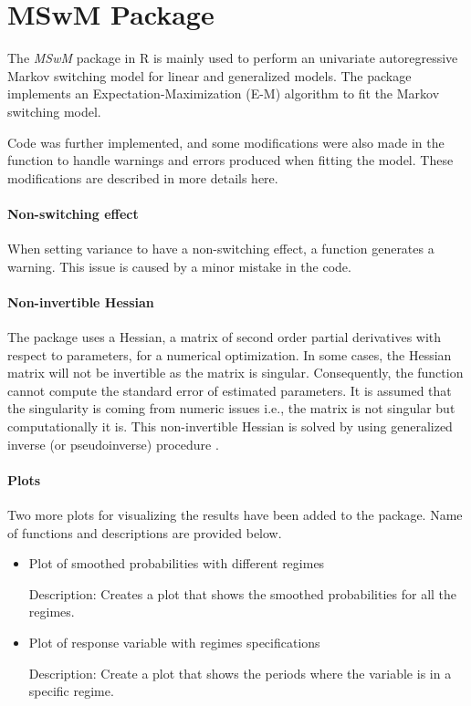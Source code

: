 \section{MSwM Package\label{sec:MSwM-Package}}

The \emph{MSwM} package in R \citep{mswm} is mainly used to perform
an univariate autoregressive Markov switching model for linear and
generalized models. The package implements an Expectation-Maximization
(E-M) algorithm to fit the Markov switching model. 

Code was further implemented, and some modifications were also made
in the function to handle warnings and errors produced when fitting
the model. These modifications are described in more details here.

\paragraph*{Non-switching effect}

When setting variance to have a non-switching effect, a function generates
a warning. This issue is caused by a minor mistake in the code. 

\paragraph{Non-invertible Hessian}

The package uses a Hessian, a matrix of second order partial derivatives
with respect to parameters, for a numerical optimization. In some
cases, the Hessian matrix will not be invertible as the matrix is
singular. Consequently, the function cannot compute the standard error
of estimated parameters. It is assumed that the singularity is coming
from numeric issues i.e., the matrix is not singular but computationally
it is. This non-invertible Hessian is solved by using generalized
inverse (or pseudoinverse) procedure \citep{gill2004your}. 

\paragraph*{Plots}

Two more plots for visualizing the results have been added to the
package. Name of functions and descriptions are provided below. 
\begin{itemize}
\item {} 

Plot of smoothed probabilities with different regimes

Description: Creates a plot that shows the smoothed probabilities
for all the regimes.
\item {} 

Plot of response variable with regimes specifications

Description: Create a plot that shows the periods where the variable
is in a specific regime.
\end{itemize}


